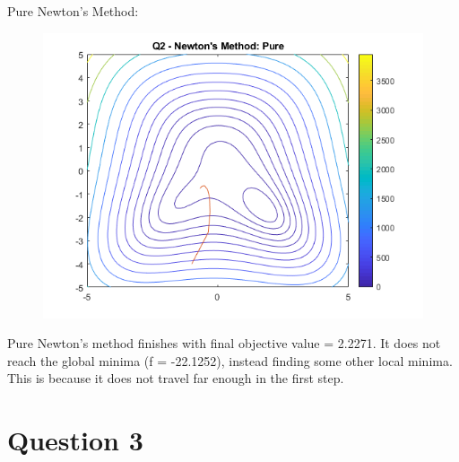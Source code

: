 \documentclass[10pt,a4paper]{article}
\begin{document}
\newpage
Pure Newton's Method:
\begin{figure} [H]
	\centering
	\includegraphics[width=0.7\linewidth]{q2np}
\end{figure}
Pure Newton's method finishes with final objective value = 2.2271. It does not reach the global minima (f = -22.1252), instead finding some other local minima. This is because it does not travel far enough in the first step.
\newpage
\section*{Question 3}
\end{document}
